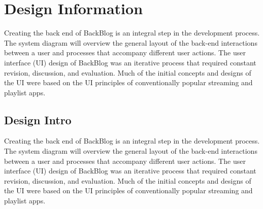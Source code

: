 \documentclass[12pt,asmart]{report}
\begin{document}
\chapter{Design Information}
Creating the back end of BackBlog is an integral step in the development process. The system diagram will overview the general layout of the back-end interactions between a user and processes that accompany different user actions.
The user interface (UI) design of BackBlog was an iterative process that required constant revision, discussion, and evaluation. Much of the initial concepts and designs of the UI were based on the UI principles of conventionally popular streaming and playlist apps.
\section{Design Intro}
Creating the back end of BackBlog is an integral step in the development process. The system diagram will overview the general layout of the back-end interactions between a user and processes that accompany different user actions.
The user interface (UI) design of BackBlog was an iterative process that required constant revision, discussion, and evaluation. Much of the initial concepts and designs of the UI were based on the UI principles of conventionally popular streaming and playlist apps.
\end{document}
